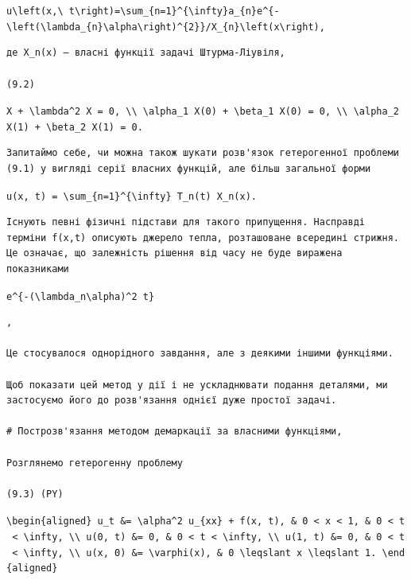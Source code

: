 \documentclass[
  ukrainian,
]{article}
\begin{document}
\texttt{u\textbackslash{}left(x,\textbackslash{}\ t\textbackslash{}right)=\textbackslash{}sum\_\{n=1\}\^{}\{\textbackslash{}infty\}a\_\{n\}e\^{}\{-\textbackslash{}left(\textbackslash{}lambda\_\{n\}\textbackslash{}alpha\textbackslash{}right)\^{}\{2\}\}/X\_\{n\}\textbackslash{}left(x\textbackslash{}right),}

\begin{verbatim}
де X_n(x) — власні функції задачі Штурма-Ліувіля,

(9.2)
\end{verbatim}

\texttt{X\textquotesingle{}\textquotesingle{}\ +\ \textbackslash{}lambda\^{}2\ X\ =\ 0,\ \textbackslash{}\textbackslash{}\ \textbackslash{}alpha\_1\ X\textquotesingle{}(0)\ +\ \textbackslash{}beta\_1\ X(0)\ =\ 0,\ \textbackslash{}\textbackslash{}\ \textbackslash{}alpha\_2\ X\textquotesingle{}(1)\ +\ \textbackslash{}beta\_2\ X(1)\ =\ 0.}

\begin{verbatim}
Запитаймо себе, чи можна також шукати розв'язок гетерогенної проблеми (9.1) у вигляді серії власних функцій, але більш загальної форми
\end{verbatim}

\texttt{u(x,\ t)\ =\ \textbackslash{}sum\_\{n=1\}\^{}\{\textbackslash{}infty\}\ T\_n(t)\ X\_n(x).}

\begin{verbatim}
Існують певні фізичні підстави для такого припущення. Насправді терміни f(x,t) описують джерело тепла, розташоване всередині стрижня. Це означає, що залежність рішення від часу не буде виражена показниками
\end{verbatim}

\texttt{e\^{}\{-(\textbackslash{}lambda\_n\textbackslash{}alpha)\^{}2\ t\}}

\begin{verbatim}
,

Це стосувалося однорідного завдання, але з деякими іншими функціями.

Щоб показати цей метод у дії і не ускладнювати подання деталями, ми застосуємо його до розв'язання однієї дуже простої задачі.

# Построзв'язання методом демаркації за власними функціями,

Розглянемо гетерогенну проблему

(9.3) (PY)
\end{verbatim}

\texttt{\textbackslash{}begin\{aligned\}\ u\_t\ \&=\ \textbackslash{}alpha\^{}2\ u\_\{xx\}\ +\ f(x,\ t),\ \&\ 0\ \textless{}\ x\ \textless{}\ 1,\ \&\ 0\ \textless{}\ t\ \textless{}\ \textbackslash{}infty,\ \textbackslash{}\textbackslash{}\ u(0,\ t)\ \&=\ 0,\ \&\ 0\ \textless{}\ t\ \textless{}\ \textbackslash{}infty,\ \textbackslash{}\textbackslash{}\ u(1,\ t)\ \&=\ 0,\ \&\ 0\ \textless{}\ t\ \textless{}\ \textbackslash{}infty,\ \textbackslash{}\textbackslash{}\ u(x,\ 0)\ \&=\ \textbackslash{}varphi(x),\ \&\ 0\ \textbackslash{}leqslant\ x\ \textbackslash{}leqslant\ 1.\ \textbackslash{}end\{aligned\}}
\end{document}

